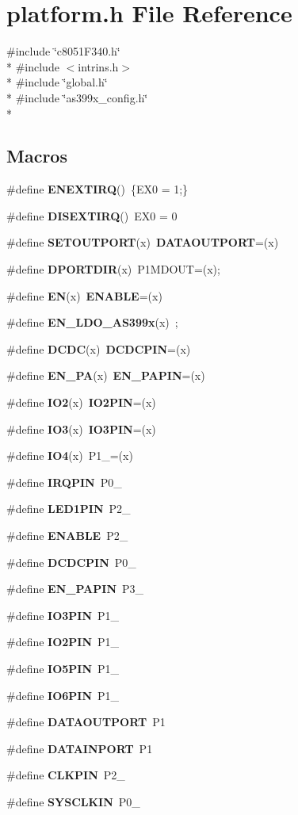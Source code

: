 \section{platform.\-h File Reference}
\label{platform_8h}
{\ttfamily \#include \char`\"{}c8051\-F340.\-h\char`\"{}}\\*
{\ttfamily \#include $<$intrins.\-h$>$}\\*
{\ttfamily \#include \char`\"{}global.\-h\char`\"{}}\\*
{\ttfamily \#include \char`\"{}as399x\-\_\-config.\-h\char`\"{}}\\*
\subsection*{Macros}
\begin{DoxyCompactItemize}
\item 
\#define {\bf E\-N\-E\-X\-T\-I\-R\-Q}()~\{E\-X0 = 1;\}
\item 
\#define {\bf D\-I\-S\-E\-X\-T\-I\-R\-Q}()~E\-X0 = 0
\item 
\#define {\bf S\-E\-T\-O\-U\-T\-P\-O\-R\-T}(x)~{\bf D\-A\-T\-A\-O\-U\-T\-P\-O\-R\-T}=(x)
\item 
\#define {\bf D\-P\-O\-R\-T\-D\-I\-R}(x)~P1\-M\-D\-O\-U\-T=(x);
\item 
\#define {\bf E\-N}(x)~{\bf E\-N\-A\-B\-L\-E}=(x)
\item 
\#define {\bf E\-N\-\_\-\-L\-D\-O\-\_\-\-A\-S399x}(x)~;
\item 
\#define {\bf D\-C\-D\-C}(x)~{\bf D\-C\-D\-C\-P\-I\-N}=(x)
\item 
\#define {\bf E\-N\-\_\-\-P\-A}(x)~{\bf E\-N\-\_\-\-P\-A\-P\-I\-N}=(x)
\item 
\#define {\bf I\-O2}(x)~{\bf I\-O2\-P\-I\-N}=(x)
\item 
\#define {\bf I\-O3}(x)~{\bf I\-O3\-P\-I\-N}=(x)
\item 
\#define {\bf I\-O4}(x)~P1\-\_=(x)
\item 
\#define {\bf I\-R\-Q\-P\-I\-N}~P0\-\_
\item 
\#define {\bf L\-E\-D1\-P\-I\-N}~P2\-\_
\item 
\#define {\bf E\-N\-A\-B\-L\-E}~P2\-\_
\item 
\#define {\bf D\-C\-D\-C\-P\-I\-N}~P0\-\_
\item 
\#define {\bf E\-N\-\_\-\-P\-A\-P\-I\-N}~P3\-\_
\item 
\#define {\bf I\-O3\-P\-I\-N}~P1\-\_
\item 
\#define {\bf I\-O2\-P\-I\-N}~P1\-\_
\item 
\#define {\bf I\-O5\-P\-I\-N}~P1\-\_
\item 
\#define {\bf I\-O6\-P\-I\-N}~P1\-\_
\item 
\#define {\bf D\-A\-T\-A\-O\-U\-T\-P\-O\-R\-T}~P1
\item 
\#define {\bf D\-A\-T\-A\-I\-N\-P\-O\-R\-T}~P1
\item 
\#define {\bf C\-L\-K\-P\-I\-N}~P2\-\_
\item 
\#define {\bf S\-Y\-S\-C\-L\-K\-I\-N}~P0\-\_
\end{DoxyCompactItemize}


